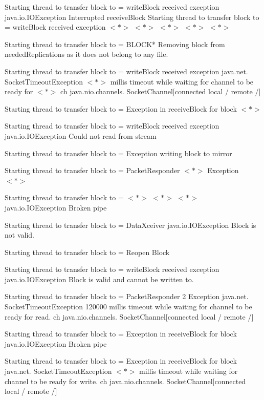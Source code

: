 \documentclass[12pt,a4paper]{article}
\begin{document}
	\noindent Starting thread to transfer block to = writeBlock received exception java.io.IOException Interrupted receiveBlock
	Starting thread to transfer block to = writeBlock received exception $<*>$ $<*>$ $<*>$ $<*>$ $<*>$
	
	\noindent Starting thread to transfer block to = BLOCK* Removing block from neededReplications as it does not belong to any file.
	
	\noindent Starting thread to transfer block to = writeBlock received exception java.net. SocketTimeoutException $<*>$ millis timeout while waiting for channel to be ready for $<*>$ ch java.nio.channels. SocketChannel[connected local / remote /]
	
	\noindent Starting thread to transfer block to = Exception in receiveBlock for block $<*>$
	
	\noindent Starting thread to transfer block to = writeBlock received exception java.io.IOException Could not read from stream
	
	\noindent Starting thread to transfer block to = Exception writing block to mirror
	
	\noindent Starting thread to transfer block to = PacketResponder $<*>$ Exception $<*>$
	
	\noindent Starting thread to transfer block to = $<*>$ $<*>$ $<*>$ java.io.IOException Broken pipe
	
	\noindent Starting thread to transfer block to = DataXceiver java.io.IOException Block is not valid.
	
	\noindent Starting thread to transfer block to = Reopen Block
	
	\noindent Starting thread to transfer block to = writeBlock received exception java.io.IOException Block is valid and cannot be written to.
	
	\noindent Starting thread to transfer block to = PacketResponder 2 Exception java.net. SocketTimeoutException 120000 millis timeout while waiting for channel to be ready for read. ch java.nio.channels. SocketChannel[connected local / remote /]
	
	\noindent Starting thread to transfer block to = Exception in receiveBlock for block java.io.IOException Broken pipe
	
	\noindent Starting thread to transfer block to = Exception in receiveBlock for block java.net. SocketTimeoutException $<*>$ millis timeout while waiting for channel to be ready for write. ch java.nio.channels. SocketChannel[connected local / remote /]
	
\end{document}
